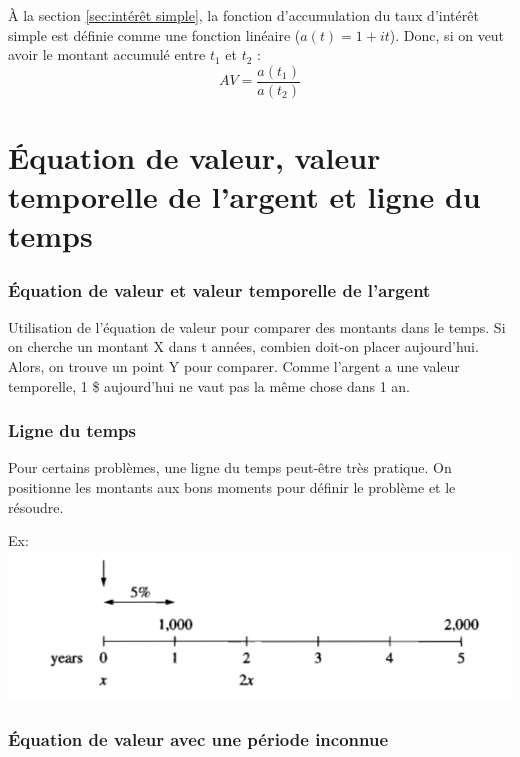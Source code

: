 \documentclass[11pt,french]{report}
\begin{document}
À la section \ref{sec:intérêt simple}, la fonction d'accumulation du taux d'intérêt simple est définie comme une fonction linéaire ($a(t) = 1+ it$).  Donc, si on veut avoir le montant accumulé entre $t_1$ et $t_2$ :
\begin{equation}
AV = \frac{a(t_1)}{a(t_2)}
\end{equation}


\chapter{Équation de valeur, valeur temporelle de l'argent et ligne du temps}
\label{Chap:chap 2}

\subsection{Équation de valeur et valeur temporelle de l'argent}
\label{sec:Équation valeur et valeur temporelle}

Utilisation de l'équation de valeur pour comparer des montants dans le temps. Si on cherche un montant X dans t années, combien doit-on placer aujourd'hui. Alors, on trouve un point Y pour comparer.
Comme l'argent a une valeur temporelle, 1 \$ aujourd'hui ne vaut pas la même chose dans 1 an.
\subsection{Ligne du temps}
Pour certains problèmes, une ligne du temps peut-être très pratique. On positionne les montants aux bons moments pour définir le problème et le résoudre.

Ex:
\\ \includegraphics[scale=0.65]{picture1.PNG}

\subsection{Équation de valeur avec une période inconnue}
\label{sec:Équation valeur et période inconnue}
\end{document}
